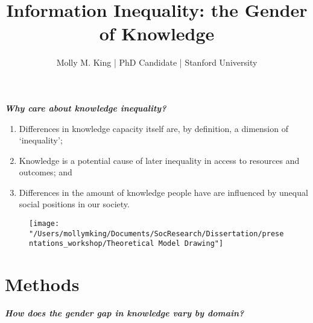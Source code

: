 \documentclass[]{article}
\begin{document}
 \title{\vspace{-1.0cm}Information Inequality: the Gender of Knowledge}
 \date{}
 \author{Molly M. King  |  PhD Candidate  |  Stanford University}

 \maketitle


\emph{\textbf{Why care about knowledge inequality?}}

\begin{enumerate}
  \item{Differences in knowledge capacity itself are, by definition, a dimension of `inequality';}
  \item{Knowledge is a potential cause of later inequality in access to resources and outcomes; and}
  \item{Differences in the amount of knowledge people have are influenced by unequal social positions in our society.}
\end{enumerate}


    \begin{figure}[htb]
      \begin{center}
        \texttt{[image: "/Users/mollymking/Documents/SocResearch/Dissertation/presentations\_workshop/Theoretical Model Drawing"]}
      \end{center}
    \end{figure}


\section{Methods}\label{methods}

\emph{\textbf{How does the gender gap in knowledge vary by domain?}}
\end{document}
